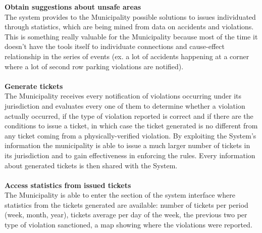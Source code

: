 \documentclass {article}
\begin{document}
\begin{itemize}
		{\bf Obtain suggestions about unsafe areas}\\
		The system provides to the Municipality possible solutions to issues individuated through statistics, which are being mined from data on accidents and violations. This is something really valuable for the Municipality because most of the time it doesn’t have the tools itself to individuate connections and cause-effect relationship in the series of events (ex. a lot of accidents happening at a corner where a lot of second row parking violations are notified).\\ \\
		{\bf Generate tickets}\\
		The Municipality receives every notification of violations occurring under its jurisdiction and evaluates every one of them to determine whether a violation actually occurred, if the type of violation reported is correct and if there are the conditions to issue a ticket, in which case the ticket generated is no different from any ticket coming from a physically-verified violation. By exploiting the System’s information the municipality is able to issue a much larger number of tickets in its jurisdiction and to gain effectiveness in enforcing the rules. Every information about generated tickets is then shared with the System.\\ \\
		{\bf Access statistics from issued tickets}\\
		The Municipality is able to enter the section of the system interface where statistics from the tickets generated are available: number of tickets per period (week, month, year), tickets average per day of the week, the previous two per type of violation sanctioned, a map showing where the violations were reported.\\ \\
		
		
	\end{itemize}
	\pagebreak
		
\end{document}
